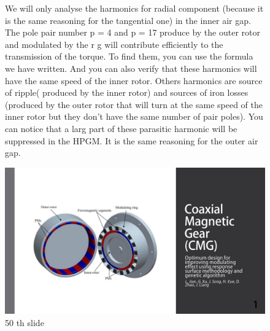 \begin{figure}[H]
    \begin{minipage}{.45\linewidth}
   We will only analyse the harmonics for radial component (because it is the same reasoning for the tangential one) in the inner air gap.
   The pole pair number p = 4 and p = 17 produce by the outer rotor and modulated by the r
 g will contribute efficiently to the transmission of the torque. To find them, you can use the formula we have written. And you can also verify that these harmonics will have the same speed of the inner rotor. Others harmonics are source of ripple( produced by the inner rotor) and sources of iron losses (produced by the outer rotor that will turn at the same speed of the inner rotor but they don't have the same number of pair poles). You can notice that a larg part of these parasitic harmonic will be suppressed in the HPGM.
   It is the same reasoning for the outer air gap.   \end{minipage}
    \hfill%
    \begin{minipage}[c]{.45\linewidth}
        \centering
        \includegraphics[page={50},width=\textwidth]{LELEC2311.allow.pdf}
        \caption{50 th slide}
    \end{minipage}
\end{figure}

